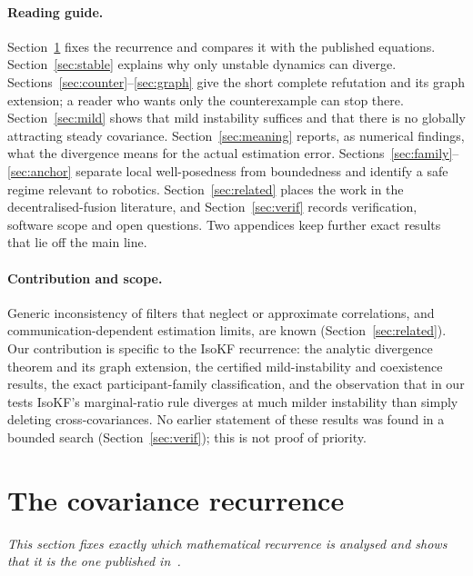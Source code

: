 \documentclass[11pt,a4paper]{article}
\numberwithin{equation}{section}
\theoremstyle{remark}\newtheorem{remark}[theorem]{Remark}
\begin{document}
\paragraph{Reading guide.} Section~\ref{sec:recurrence} fixes the recurrence and compares it
with the published equations. Section~\ref{sec:stable} explains why only unstable dynamics can
diverge. Sections~\ref{sec:counter}--\ref{sec:graph} give the short complete refutation and its
graph extension; a reader who wants only the counterexample can stop there.
Section~\ref{sec:mild} shows that mild instability suffices and that there is no globally
attracting steady covariance. Section~\ref{sec:meaning} reports, as numerical findings, what the divergence means
for the actual estimation error. Sections~\ref{sec:family}--\ref{sec:anchor} separate local
well-posedness from boundedness and identify a safe regime relevant to robotics.
Section~\ref{sec:related} places the work in the decentralised-fusion literature, and
Section~\ref{sec:verif} records verification, software scope and open questions. Two appendices
keep further exact results that lie off the main line.

\paragraph{Contribution and scope.} Generic inconsistency of filters that neglect or
approximate correlations, and communication-dependent estimation limits, are known
(Section~\ref{sec:related}). Our contribution is specific to the IsoKF recurrence: the
analytic divergence theorem and its graph extension, the certified mild-instability and
coexistence results, the exact participant-family classification, and the observation that
in our tests IsoKF's marginal-ratio rule diverges at much milder instability than simply
deleting cross-covariances. No earlier statement of these results was found in a bounded
search (Section~\ref{sec:verif}); this is not proof of priority.

\section{The covariance recurrence}\label{sec:recurrence}

\emph{This section fixes exactly which mathematical recurrence is analysed and shows that it is
the one published in~\citep{JungLuftWeiss2025}.}
\end{document}
